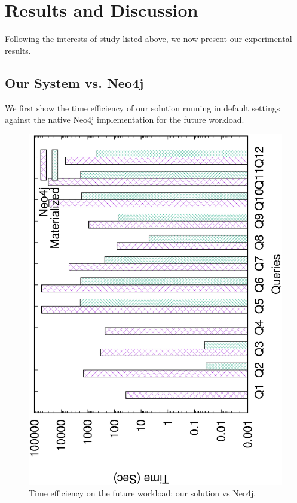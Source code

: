 
\section{Results and Discussion}
\label{Results and Discussion}
Following the interests of study listed above, we now present our experimental results.

\subsection{Our System vs. Neo4j}
\label{Our System vs. Neo4j}
We first show the time efficiency of our solution running in default settings against the native Neo4j implementation for the future workload.


\begin{figure}[H]
	\centering
	\includegraphics[scale=0.5, angle=270]{plot/neo4j.eps}
	\caption{Time efficiency on the future workload: our solution vs Neo4j.}
	\label{fig:neo4j}
\end{figure}

